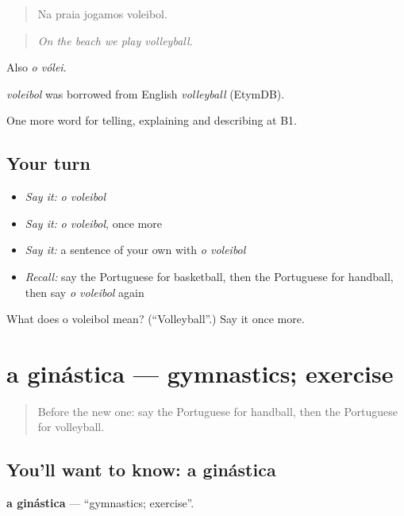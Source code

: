 \begin{quote}
Na praia jogamos voleibol.
\end{quote}

\begin{quote}
\emph{On the beach we play volleyball.}
\end{quote}

Also \emph{o vólei}.

\begin{cousinweb}
\emph{voleibol} was borrowed from English \emph{volleyball} (EtymDB).
\end{cousinweb}

\begin{grammarlens}[title={What you've built}]
One more word for telling, explaining and describing at B1.
\end{grammarlens}

\subsection*{Your turn}
\begin{itemize}
\raggedright
  \item \emph{Say it:} \emph{o voleibol}
  \item \emph{Say it:} \emph{o voleibol}, once more
  \item \emph{Say it:} a sentence of your own with \emph{o voleibol}
  \item \emph{Recall:} say the Portuguese for basketball, then the Portuguese for handball, then say \emph{o voleibol} again
\end{itemize}

\begin{tcolorbox}[breakable,colback=teal!4,colframe=teal!35!black,title={Before you move on}]
What does o voleibol mean? (\textquotedblleft{}Volleyball\textquotedblright{}.) Say it once more.
\end{tcolorbox}
\section[a ginástica]{a ginástica — gymnastics; exercise}

\label{lesson:PT-C512-ginastica}



\begin{quote}
Before the new one: say the Portuguese for handball, then the Portuguese for volleyball.
\end{quote}

\subsection*{You'll want to know: a ginástica}
\textbf{a ginástica} — \textquotedblleft{}gymnastics; exercise\textquotedblright{}.

